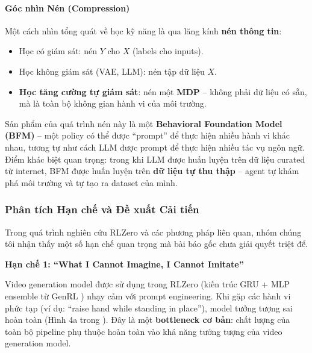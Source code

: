 \paragraph{Góc nhìn Nén (Compression)}

Một cách nhìn tổng quát về học kỹ năng là qua lăng kính
\textbf{nén thông tin}:
\begin{itemize}
    \item Học có giám sát: nén $Y$ cho $X$ (labels cho inputs).
    \item Học không giám sát (VAE, LLM): nén tập dữ liệu $X$.
    \item \textbf{Học tăng cường tự giám sát}: nén một \textbf{MDP} -- không
    phải dữ liệu có sẵn, mà là toàn bộ không gian hành vi của môi
    trường.
\end{itemize}

Sản phẩm của quá trình nén này là một \textbf{Behavioral Foundation
Model (BFM)} -- một policy có thể được ``prompt'' để thực hiện nhiều
hành vi khác nhau, tương tự như cách LLM được prompt để thực hiện
nhiều tác vụ ngôn ngữ. Điểm khác biệt quan trọng: trong khi LLM được
huấn luyện trên dữ liệu curated từ internet, BFM được huấn luyện trên
\textbf{dữ liệu tự thu thập} -- agent tự khám phá môi trường và tự
tạo ra dataset của mình.


\subsubsection*{Phân tích Hạn chế và Đề xuất Cải tiến}

Trong quá trình nghiên cứu RLZero và các phương pháp liên quan, nhóm
chúng tôi nhận thấy một số hạn chế quan trọng mà bài báo gốc chưa
giải quyết triệt để.

\textbf{Hạn chế 1: ``What I Cannot Imagine, I Cannot Imitate''}

Video generation model được sử dụng trong RLZero (kiến trúc GRU +
MLP ensemble từ GenRL \cite{sikchi2025rlzero}) nhạy cảm với prompt
engineering. Khi gặp các hành vi phức tạp (ví dụ:
``raise hand while standing in place''), model tưởng tượng sai hoàn
toàn (Hình 4a trong \cite{sikchi2025rlzero}). Đây là một
\textbf{bottleneck cơ bản}: chất lượng của toàn bộ pipeline phụ thuộc
hoàn toàn vào khả năng tưởng tượng của video generation model.

